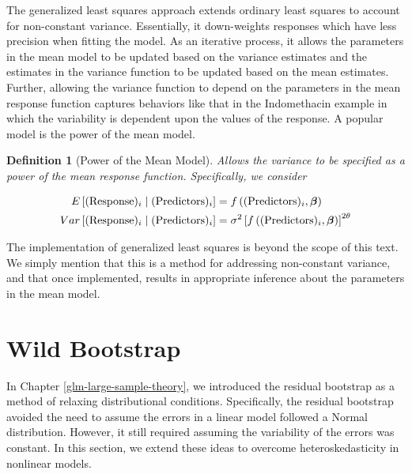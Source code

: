 \documentclass[
]{book}
\theoremstyle{plain}
\theoremstyle{mydefn}
\newtheorem{definition}{Definition}[chapter]
\theoremstyle{myexmpl}
\theoremstyle{remark}
\begin{document}
The generalized least squares approach extends ordinary least squares to account for non-constant variance. Essentially, it down-weights responses which have less precision when fitting the model. As an iterative process, it allows the parameters in the mean model to be updated based on the variance estimates and the estimates in the variance function to be updated based on the mean estimates. Further, allowing the variance function to depend on the parameters in the mean response function captures behaviors like that in the Indomethacin example in which the variability is dependent upon the values of the response. A popular model is the power of the mean model.

\begin{definition}[Power of the Mean Model]
\protect\hypertarget{def:nlm-pom}{}{\label{def:nlm-pom} {} }Allows the variance to be specified as a power of the mean response function. Specifically, we consider

\[
\begin{aligned}
  E\left[(\text{Response})_i \mid (\text{Predictors})_i\right]
    &= f\left((\text{Predictors})_i, \boldsymbol{\beta}\right) \\
  Var\left[(\text{Response})_i \mid (\text{Predictors})_i\right]
    &= \sigma^2 \left[f\left((\text{Predictors})_i, \boldsymbol{\beta}\right)\right]^{2\theta}
\end{aligned}
\]
\end{definition}

The implementation of generalized least squares is beyond the scope of this text. We simply mention that this is a method for addressing non-constant variance, and that once implemented, results in appropriate inference about the parameters in the mean model.

\hypertarget{wild-bootstrap}{%
\section{Wild Bootstrap}\label{wild-bootstrap}}

In Chapter \ref{glm-large-sample-theory}, we introduced the residual bootstrap as a method of relaxing distributional conditions. Specifically, the residual bootstrap avoided the need to assume the errors in a linear model followed a Normal distribution. However, it still required assuming the variability of the errors was constant. In this section, we extend these ideas to overcome heteroskedasticity in nonlinear models.
\end{document}
